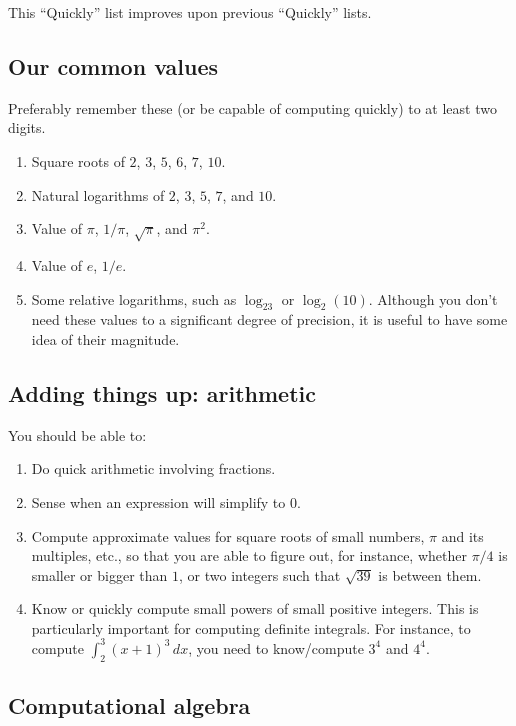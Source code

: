 \documentclass[10pt]{amsart}
\begin{document}
This ``Quickly'' list improves upon previous ``Quickly'' lists.

\subsection{Our common values}

Preferably remember these (or be capable of computing quickly) to at
least two digits.

\begin{enumerate}
\item Square roots of $2$, $3$, $5$, $6$, $7$, $10$.
\item Natural logarithms of $2$, $3$, $5$, $7$, and $10$.
\item Value of $\pi$, $1/\pi$, $\sqrt{\pi}$, and $\pi^2$.
\item Value of $e$, $1/e$.
\item Some relative logarithms, such as $\log_23$ or
  $\log_2(10)$. Although you don't need these values to a significant
  degree of precision, it is useful to have some idea of their
  magnitude.
\end{enumerate}

\subsection{Adding things up: arithmetic}

You should be able to:

\begin{enumerate}
\item Do quick arithmetic involving fractions.
\item Sense when an expression will simplify to $0$.
\item Compute approximate values for square roots of small numbers,
  $\pi$ and its multiples, etc., so that you are able to figure out,
  for instance, whether $\pi/4$ is smaller or bigger than $1$, or two
  integers such that $\sqrt{39}$ is between them.
\item Know or quickly compute small powers of small positive
  integers. This is particularly important for computing definite
  integrals. For instance, to compute $\int_2^3 (x + 1)^3 \, dx$, you
  need to know/compute $3^4$ and $4^4$.
\end{enumerate}

\subsection{Computational algebra}
\end{document}
